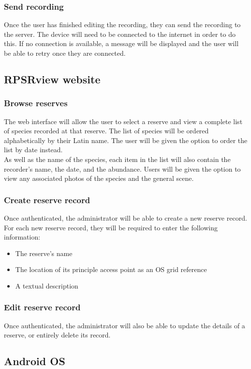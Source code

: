 \documentclass[12pt]{article}
\begin{document}
		\subsubsection{Send recording}
			Once the user has finished editing the recording, they can send the recording to the server. The device will need to be connected to the internet in order to do this. If no connection is available, a message will be displayed and the user will be able to retry once they are connected.

	\subsection{RPSRview website}
		\subsubsection{Browse reserves}
			The web interface will allow the user to select a reserve and view a complete list of species recorded at that reserve. The list of species will be ordered alphabetically by their Latin name. The user will be given the option to order the list by date instead.\\
			As well as the name of the species, each item in the list will also contain the recorder's name, the date, and the abundance. Users will be given the option to view any associated photos of the species and the general scene.
		\subsubsection{Create reserve record}
			Once authenticated, the administrator will be able to create a new reserve record. For each new reserve record, they will be required to enter the following information:
			\begin{itemize}
				\item The reserve's name
				\item The location of its principle access point as an OS grid reference
				\item A textual description
			\end{itemize}
		\subsubsection{Edit reserve record}
			Once authenticated, the administrator will also be able to update the details of a reserve, or entirely delete its record.

  \subsection{Android OS}
\end{document}
